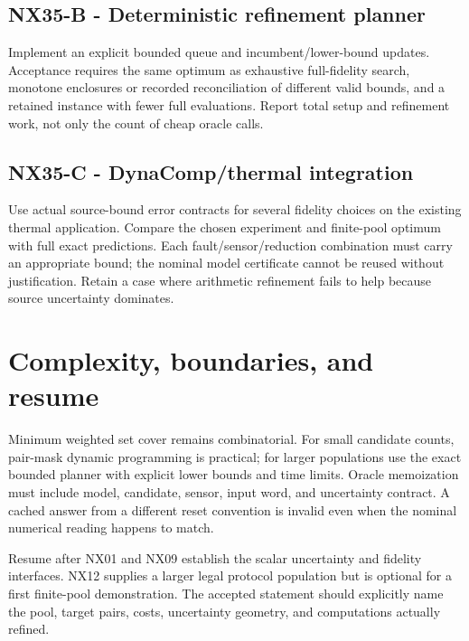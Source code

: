 \documentclass[
  11pt,
  a4paper,
]{report}
\begin{document}
\hypertarget{nx35-b---deterministic-refinement-planner}{%
\subsection{NX35-B - Deterministic refinement
planner}\label{nx35-b---deterministic-refinement-planner}}

Implement an explicit bounded queue and incumbent/lower-bound updates.
Acceptance requires the same optimum as exhaustive full-fidelity search,
monotone enclosures or recorded reconciliation of different valid
bounds, and a retained instance with fewer full evaluations. Report
total setup and refinement work, not only the count of cheap oracle
calls.

\hypertarget{nx35-c---dynacompthermal-integration}{%
\subsection{NX35-C - DynaComp/thermal
integration}\label{nx35-c---dynacompthermal-integration}}

Use actual source-bound error contracts for several fidelity choices on
the existing thermal application. Compare the chosen experiment and
finite-pool optimum with full exact predictions. Each
fault/sensor/reduction combination must carry an appropriate bound; the
nominal model certificate cannot be reused without justification. Retain
a case where arithmetic refinement fails to help because source
uncertainty dominates.

\hypertarget{complexity-boundaries-and-resume}{%
\section{Complexity, boundaries, and
resume}\label{complexity-boundaries-and-resume}}

Minimum weighted set cover remains combinatorial. For small candidate
counts, pair-mask dynamic programming is practical; for larger
populations use the exact bounded planner with explicit lower bounds and
time limits. Oracle memoization must include model, candidate, sensor,
input word, and uncertainty contract. A cached answer from a different
reset convention is invalid even when the nominal numerical reading
happens to match.

Resume after NX01 and NX09 establish the scalar uncertainty and fidelity
interfaces. NX12 supplies a larger legal protocol population but is
optional for a first finite-pool demonstration. The accepted statement
should explicitly name the pool, target pairs, costs, uncertainty
geometry, and computations actually refined.
\end{document}
